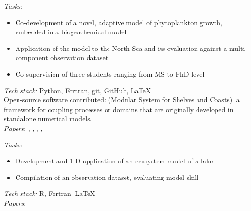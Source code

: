 \documentclass[
	a4paper,
]{fortysecondscv}
\begin{document}
\cvsection{}
\begin{cvtable}[1.0]
	{\href{https://www.hereon.de/}{\color{pblue}{Helmholtz-Zentrum Hereon, Germany}}}
	{\textit{Tasks}:
	\begin{itemize}[topsep=0pt,itemsep=0pt,partopsep=0pt, parsep=0pt, leftmargin=*]
     \item Co-development of a novel, adaptive model of phytoplankton growth, embedded in a biogeochemical model
     \item Application of the model to the North Sea and its evaluation against a multi-component observation dataset
     \item Co-supervision of three students ranging from MS to PhD level
    \end{itemize}
      \textit{Tech stack:} Python, Fortran, git, GitHub, \LaTeX \\
      Open-source software contributed:
      \href{git@github.com:platipodium/mossco-code.git}{\color{pblue}{MOSSCO}} (Modular System for Shelves and Coasts): a framework for coupling processes or domains that are originally developed in standalone numerical models.\\
      \textit{Papers}:
      \href{https://doi.org/10.3389/fevo.2016.00131}{\color{pblue}{1}}
      \href{https://doi.org/10.1016/j.ecolmodel.2017.07.008}{\color{pblue}{2}},
      \href{https://doi.org/10.5194/bg-14-4499-2017}{\color{pblue}{3}},
      \href{https://doi.org/10.5194/gmd-11-915-2018}{\color{pblue}{4}},
      \href{https://doi.org/10.1016/j.ecss.2017.11.002}{\color{pblue}{5}},
      \href{https://doi.org/10.1007/s10750-018-3653-5}{\color{pblue}{6}}
      }

	{\href{https://www.inrae.fr/en}{\color{pblue}{INRAe, France}}}
	{\textit{Tasks}:
	\begin{itemize}[topsep=0pt,itemsep=0pt,partopsep=0pt, parsep=0pt, leftmargin=*]
     \item Development and 1-D application of an ecosystem model of a lake
     \item Compilation of an observation dataset, evaluating model skill
    \end{itemize}
      \textit{Tech stack:} R, Fortran, \LaTeX \\
      \textit{Papers}:
      \href{https://doi.org/10.1111/fwb.12444}{\color{pblue}{1}}
      \href{https://doi.org/10.1007/s10021-014-9837-6}{\color{pblue}{2}}
      \href{https://doi.org/10.1016/j.ecolmodel.2017.06.005}{\color{pblue}{3}}
      \href{https://doi.org/10.1016/j.envsoft.2017.11.016}{\color{pblue}{4}}
      }       


\end{cvtable}
\end{document}
